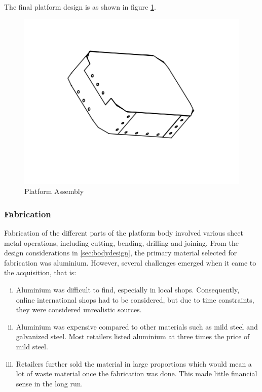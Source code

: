 The final platform design is as shown in figure \ref{fig:platformdesign}.

\begin{figure}[H]
    \centering
    \includegraphics{Figures/bodyParts.png}
    \caption{Platform Assembly}
    \label{fig:platformdesign}
\end{figure}


\subsubsection{Fabrication}
Fabrication of the different parts of the platform body involved various sheet metal operations, including cutting, bending, drilling and joining. From the design considerations in \ref{sec:bodydesign}, the primary material selected for fabrication was aluminium. However, several challenges emerged when it came to the acquisition, that is:
\begin{enumerate}[i.]
    \item Aluminium was difficult to find, especially in local shops. Consequently, online international shops had to be considered, but due to time constraints, they were considered unrealistic sources.
    \item Aluminium was expensive compared to other materials such as mild steel and galvanized steel. Most retailers listed aluminium at three times the price of mild steel.
    \item Retailers further sold the material in large proportions which would mean a lot of waste material once the fabrication was done. This made little financial sense in the long run.
\end{enumerate}

